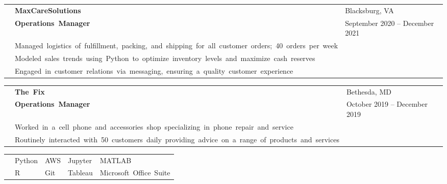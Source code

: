 \documentclass[12pt, letter]{book}
\begin{document}
\vspace{2mm}

\noindent
\begin{tabular}{@{}>{\raggedright\arraybackslash}p{3.5cm}@{}p{5cm}@{}>{\raggedleft\arraybackslash}p{10.5cm}@{}}
    & \textbf{\footnotesize\mbox{MaxCareSolutions }} & {\footnotesize {Blacksburg, VA}} \\
    & \textbf{\footnotesize\mbox{Operations Manager}} & {\footnotesize {September 2020 – December 2021}} \\
    & {\footnotesize\mbox{Managed logistics of fulfillment, packing, and shipping for all customer orders; 40 orders per week}} \\
    & {\footnotesize\mbox{Modeled sales trends using Python to optimize inventory levels and maximize cash reserves}} \\
    & {\footnotesize\mbox{Engaged in customer relations via messaging, ensuring a quality customer experience}}
\end{tabular}

\vspace{2mm}

\noindent
\begin{tabular}{@{}>{\raggedright\arraybackslash}p{3.5cm}@{}p{5cm}@{}>{\raggedleft\arraybackslash}p{10.5cm}@{}}
    & \textbf{\footnotesize\mbox{The Fix }} & {\footnotesize {Bethesda, MD}} \\
    & \textbf{\footnotesize\mbox{Operations Manager}} & {\footnotesize {October 2019 – December 2019}} \\
    & {\footnotesize\mbox{Worked in a cell phone and accessories shop specializing in phone repair and service}} \\
    & {\footnotesize\mbox{Routinely interacted with 50 customers daily providing advice on a range of products and services}}
\end{tabular}

\vspace{3mm}


\noindent
\begin{tabular}{@{}>{\raggedright\arraybackslash}p{3.5cm}@{}p{3cm}p{3cm}p{3cm}p{3cm}@{}}
    {\footnotesize{TECHNICAL}} & {\footnotesize{Python}} & {\footnotesize{AWS}} & {\footnotesize{Jupyter}} & {\footnotesize{MATLAB}} \\
    {\footnotesize{SKILLS}} & {\footnotesize{R}} & {\footnotesize{Git}} & {\footnotesize{Tableau}} & \footnotesize\mbox{{Microsoft Office Suite}} \\
\end{tabular}
\end{document}
